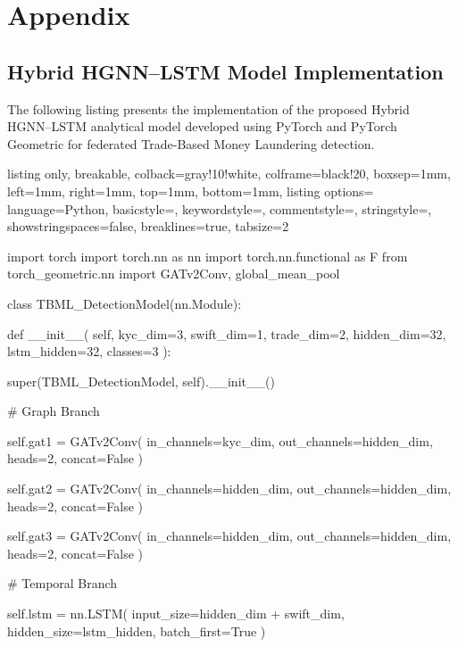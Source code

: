 \chapter{Appendix}

\section{Hybrid HGNN--LSTM Model Implementation}

The following listing presents the implementation of the proposed Hybrid HGNN--LSTM analytical model developed using PyTorch and PyTorch Geometric for federated Trade-Based Money Laundering detection.

\begin{tcblisting}{
listing only,
breakable,
colback=gray!10!white,
colframe=black!20,
boxsep=1mm,
left=1mm,
right=1mm,
top=1mm,
bottom=1mm,
listing options={
language=Python,
basicstyle=\scriptsize\ttfamily,
keywordstyle=\color{blue},
commentstyle=\color{gray},
stringstyle=\color{orange},
showstringspaces=false,
breaklines=true,
tabsize=2
}
}

import torch
import torch.nn as nn
import torch.nn.functional as F
from torch_geometric.nn import GATv2Conv, global_mean_pool

class TBML_DetectionModel(nn.Module):

    def __init__(
        self,
        kyc_dim=3,
        swift_dim=1,
        trade_dim=2,
        hidden_dim=32,
        lstm_hidden=32,
        classes=3
    ):

        super(TBML_DetectionModel, self).__init__()

        # Graph Branch

        self.gat1 = GATv2Conv(
            in_channels=kyc_dim,
            out_channels=hidden_dim,
            heads=2,
            concat=False
        )

        self.gat2 = GATv2Conv(
            in_channels=hidden_dim,
            out_channels=hidden_dim,
            heads=2,
            concat=False
        )

        self.gat3 = GATv2Conv(
            in_channels=hidden_dim,
            out_channels=hidden_dim,
            heads=2,
            concat=False
        )

        # Temporal Branch

        self.lstm = nn.LSTM(
            input_size=hidden_dim + swift_dim,
            hidden_size=lstm_hidden,
            batch_first=True
        )


\end{tcblisting}
